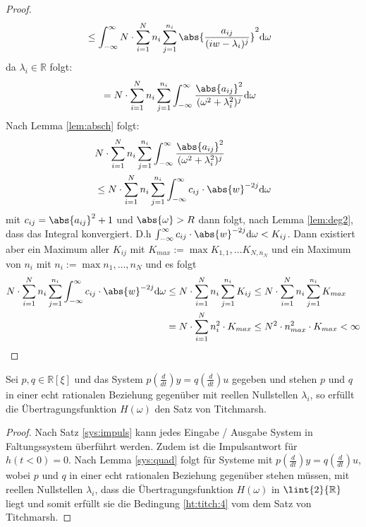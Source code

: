 \begin{lemma}
\begin{proof}
\begin{align}
	&\leq  \int_{-\infty}^{\infty} N \cdot \sum_{i=1}^{N} n_i \sum_{j=1}^{n_i}{\abs{\frac{a_{ij}}{(iw -\lambda_i)^j}}^2} \mathrm{d\omega}
\end{align}
da $\lambda_i \in \mathbb{R}$ folgt:
\begin{align}
	&=  N \cdot \sum_{i=1}^{N} n_i \sum_{j=1}^{n_i} \int_{-\infty}^{\infty}{\frac{\abs{a_{ij}}^2}{(\omega^2 +\lambda_i^2)^j}} \mathrm{d\omega}
\end{align}
Nach Lemma \ref{lem:absch} folgt:
\begin{align}
	& N \cdot \sum_{i=1}^{N} n_i \sum_{j=1}^{n_i} \int_{-\infty}^{\infty}{\frac{\abs{a_{ij}}^2}{(\omega^2 +\lambda_i^2)^j}} \\
	&\leq N \cdot \sum_{i=1}^{N} n_i \sum_{j=1}^{n_i} \int_{-\infty}^{\infty}{c_{ij} \cdot \abs{w}^{-2j}} \mathrm{d\omega}
\end{align}
mit $c_{ij} = \abs{a_{ij}}^2 + 1$ und $\abs{\omega} > R$ dann folgt, nach Lemma \ref{lem:deg2}, dass das Integral konvergiert. D.h 
$\int_{-\infty}^{\infty}{c_{ij} \cdot \abs{w}^{-2j}} \mathrm{d\omega} < K_{ij}$. Dann existiert aber ein Maximum aller $K_{ij}$ mit $K_{max} := \max{K_{1,1}, \hdots K_{N, n_{N}}}$ und ein Maximum von $n_i$ mit $n_i:= \max{n_1, \hdots, n_N}$ und es folgt
\begin{align}
	 N \cdot \sum_{i=1}^{N} n_i \sum_{j=1}^{n_i} \int_{-\infty}^{\infty}{c_{ij} \cdot \abs{w}^{-2j}} \mathrm{d\omega} &\leq N \cdot \sum_{i=1}^{N} n_i \sum_{j=1}^{n_i} K_{ij} \leq N \cdot \sum_{i=1}^{N} n_i \sum_{j=1}^{n_i} K_{max}\\
	 &= N \cdot \sum_{i=1}^{N} n_i^2 \cdot K_{max} \leq  N^2 \cdot n_{max}^2 \cdot K_{max} < \infty
\end{align}
\end{proof}    
\end{lemma}
\begin{satz}\label{sys:titch:rational} Sei $p, q \in \mathbb{R}[\xi]$ und das System $p(\frac{d}{dt})y = q(\frac{d}{dt})u$ gegeben  und stehen $p$ und $q$ in einer echt rationalen Beziehung gegenüber mit reellen Nullstellen $\lambda_i$, so erfüllt die Übertragungsfunktion $H(\omega)$ den Satz von Titchmarsh. 
\begin{proof} Nach Satz \ref{sys:impuls} kann jedes Eingabe / Ausgabe System in Faltungssystem überführt werden. 
Zudem ist die Impulsantwort für $h(t < 0) = 0$. Nach Lemma \ref{sys:quad} folgt für Systeme mit  $p(\frac{d}{dt})y = q(\frac{d}{dt})u$, wobei $p$ und $q$ in einer echt rationalen Beziehung gegenüber stehen müssen, mit reellen Nullstellen $\lambda_i$, dass die Übertragungsfunktion $H(\omega)$ in $\lint{2}{\mathbb{R}}$ liegt und somit erfüllt sie die Bedingung \ref{ht:titch:4} vom dem Satz von Titchmarsh.
\end{proof}
\end{satz}

